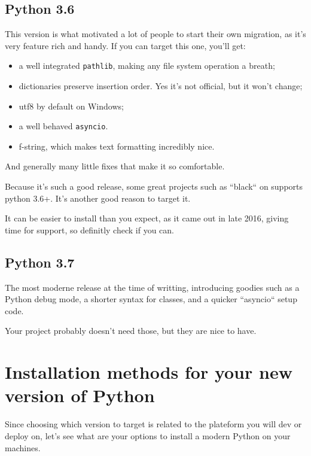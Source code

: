\subsection{Python 3.6}

This version is what motivated a lot of people to start their own migration, as it's very feature rich and handy. If you can target this one, you'll get:



\begin{itemize}
\item a well integrated \lstinline{pathlib}, making any file system operation a breath;
\item dictionaries preserve insertion order. Yes it's not official, but it won't change;
\item utf8 by default on Windows;
\item a well behaved \lstinline{asyncio}.
\item f-string, which makes text formatting incredibly nice.
\end{itemize}





And generally many little fixes that make it so comfortable.

Because it's such a good release, some great projects such as ``black`` on supports python 3.6+. It's another good reason to target it.

It can be easier to install than you expect, as it came out in late 2016, giving time for support, so definitly check if you can.

\subsection{Python 3.7}

The most moderne release at the time of writting, introducing goodies such as a Python debug mode, a shorter syntax for classes, and a quicker ``asyncio`` setup code.

Your project probably doesn't need those, but they are nice to have.

\section{Installation methods for your new version of Python}

Since choosing which version to target is related to the plateform you will dev or deploy on, let's see what are your options to install a modern Python on your machines.

